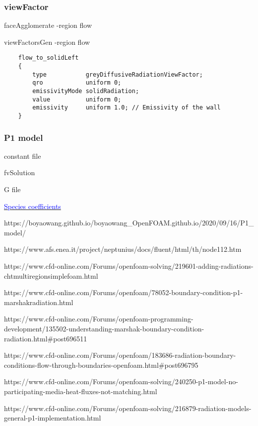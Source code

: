 \documentclass[a4paper, 12pt]{article}
\numberwithin{equation}{section}
\newcommand{\code}{\fontfamily{pcr}\selectfont}
\newcommand{\blue}[1]{\textcolor{blue}{#1}}
\begin{document}
    \subsubsection{viewFactor}

   		{\code faceAgglomerate -region flow}

   		{\code viewFactorsGen -region flow}


    {
	\begin{verbatim}
    flow_to_solidLeft
    {
        type           greyDiffusiveRadiationViewFactor;
        qro            uniform 0;
        emissivityMode solidRadiation;
        value          uniform 0;
        emissivity     uniform 1.0; // Emissivity of the wall
    }
	\end{verbatim}
	}

    \subsubsection{P1 model}

	        {\code constant file}

	        {\code fvSolution}

	        {\code G file}

	        \href{https://github.com/Cantera/cantera/pull/965/files}{\blue{Species coefficients}}

	        https://boyaowang.github.io/boyaowang\_OpenFOAM.github.io/2020/09/16/P1\_model/

	        https://www.afs.enea.it/project/neptunius/docs/fluent/html/th/node112.htm

	        https://www.cfd-online.com/Forums/openfoam-solving/219601-adding-radiations-chtmultiregionsimplefoam.html

	        https://www.cfd-online.com/Forums/openfoam/78052-boundary-condition-p1-marshakradiation.html

	        https://www.cfd-online.com/Forums/openfoam-programming-development/135502-understanding-marshak-boundary-condition-radiation.html\#post696511

	        https://www.cfd-online.com/Forums/openfoam/183686-radiation-boundary-conditions-flow-through-boundaries-openfoam.html\#post696795

	        https://www.cfd-online.com/Forums/openfoam-solving/240250-p1-model-no-participating-media-heat-fluxes-not-matching.html

	        https://www.cfd-online.com/Forums/openfoam-solving/216879-radiation-models-general-p1-implementation.html
\end{document}
